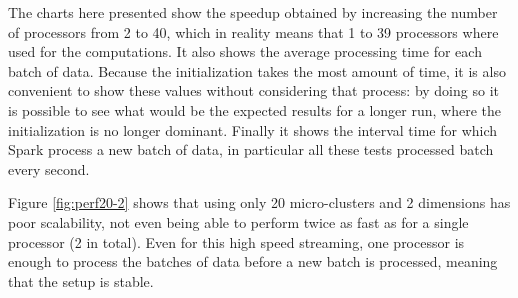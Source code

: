 The charts here presented show the speedup obtained by increasing the number of processors from 2 to 40, which in reality means that 1 to 39 processors where used for the computations. It also shows the average processing time for each batch of data. Because the initialization takes the most amount of time, it is also convenient to show these values without considering that process: by doing so it is possible to see what would be the expected results for a longer run, where the initialization is no longer dominant. Finally it shows the interval time for which Spark process a new batch of data, in particular all these tests processed batch every second.


Figure \ref{fig:perf20-2} shows that using only 20 micro-clusters and 2 dimensions has poor scalability, not even being able to perform twice as fast as for a single processor (2 in total). Even for this high speed streaming, one processor is enough to process the batches of data before a new batch is processed, meaning that the setup is stable.

